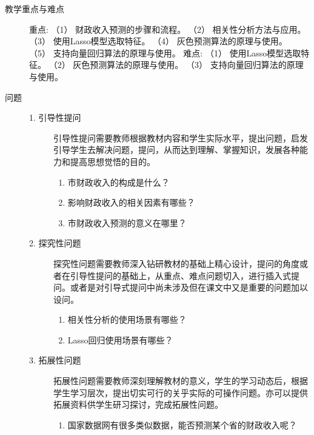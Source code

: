 \documentclass[12pt,a4paper,openany,cap]{ctexbook}
\begin{document}
\begin{description}
\item[教学重点与难点]             重点:
    （1） 财政收入预测的步骤和流程。
    （2） 相关性分析方法与应用。
    （3） 使用Lasso模型选取特征。
    （4） 灰色预测算法的原理与使用。
    （5） 支持向量回归算法的原理与使用。
            难点:
    （1） 使用Lasso模型选取特征。
    （2） 灰色预测算法的原理与使用。
    （3） 支持向量回归算法的原理与使用。
\item[问题]
  \begin{minipage}[t]{0.8\linewidth}
    \begin{description}
    \item[1. 引导性提问]    
引导性提问需要教师根据教材内容和学生实际水平，提出问题，启发引导学生去解决问题，提问，从而达到理解、掌握知识，发展各种能力和提高思想觉悟的目的。
\begin{enumerate}
\item  市财政收入的构成是什么？
\item\label{item:221}  影响财政收入的相关因素有哪些？
\item\label{item:222}  市财政收入预测的意义在哪里？            
\end{enumerate}
\item[2. 探究性问题] 
探究性问题需要教师深入钻研教材的基础上精心设计，提问的角度或者在引导性提问的基础上，从重点、难点问题切入，进行插入式提问。或者是对引导式提问中尚未涉及但在课文中又是重要的问题加以设问。
\begin{enumerate}
\item  相关性分析的使用场景有哪些？
\item\label{item:223}  Lasso回归使用场景有哪些？     
\end{enumerate}
\item[3. 拓展性问题] 
拓展性问题需要教师深刻理解教材的意义，学生的学习动态后，根据学生学习层次，提出切实可行的关乎实际的可操作问题。亦可以提供拓展资料供学生研习探讨，完成拓展性问题。
\begin{enumerate}
\item\label{item:225}  国家数据网有很多类似数据，能否预测某个省的财政收入呢？ 
\end{enumerate}
    \end{description}
  \end{minipage}


\end{description}
\end{document}
